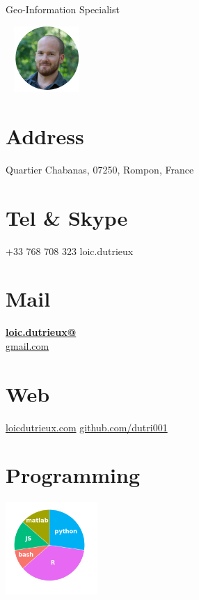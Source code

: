 \documentclass[]{friggeri-cv}
\begin{document}
      {Geo-Information Specialist}
      

\begin{aside}
    ~
    \includegraphics[width=2.5cm]{img/profile_circle_small.png}
    ~
  \section{Address}
    Quartier Chabanas,
    07250, Rompon, France
    ~
  \section{Tel \& Skype}
    +33 768 708 323
    loic.dutrieux
    ~
  \section{Mail}
    \href{mailto:loic.dutrieux@gmail.com}{\textbf{loic.dutrieux@}\\gmail.com}
    ~
  \section{Web}
    \href{http://www.loicdutrieux.com}{loicdutrieux.com}
    \href{https://github.com/dutri001}{github.com/dutri001}
    ~
  \section{Programming}
    \includegraphics[width=3.5cm]{img/programming.png}
    ~

\end{aside}
\end{document}
